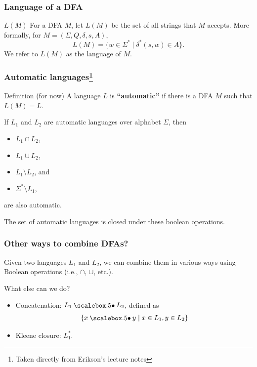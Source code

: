 \begin{frame}
  \frametitle{Language of a DFA}

  \begin{block}{$L(M)$}
    For a DFA $M$, let $L(M)$ be the set of all strings that $M$
    accepts.  More formally, for $M=(\Sigma,Q,\delta,s,A)$,
    \[
    L(M)=\{w\in\Sigma^* \;|\; \delta^*(s,w)\in A\}.
    \]
    We refer to $L(M)$ as the language of $M$.
  \end{block}
  
\end{frame}

\begin{frame}

  \frametitle{Automatic languages\footnote{Taken directly from Erikson's lecture notes}}

  \begin{block}{Definition (for now)}
    A language $L$ is {\color{red}\bf ``automatic''} if there is a DFA $M$
    such that $L(M)=L$.
  \end{block}

  \begin{lemma}
    If $L_1$ and $L_2$ are automatic languages over alphabet $\Sigma$,
    then
    \begin{itemize}
    \item $L_1\cap L_2$, 
    \item $L_1\cup L_2$, 
    \item $L_1\setminus L_2$, and 
    \item $\Sigma^* \setminus L_1$,
    \end{itemize}
    are also automatic.
  \end{lemma}

  The set of automatic languages is closed under these boolean
  operations.
  
\end{frame}

\begin{frame}
  \frametitle{Other ways to combine DFAs?}

  Given two languages $L_1$ and $L_2$, we can combine them in various
  ways using Boolean operations (i.e., $\cap$, $\cup$, etc.).

  What else can we do?

  \pause

  \begin{itemize}
  \item Concatenation: $L_1\sbullet L_2$, defined as \pause
    \[
    \{x\sbullet y \;|\; x\in L_1, y\in L_2 \}
    \]
    \pause
  \item Kleene closure: $L_1^*$.
  \end{itemize}
\end{frame}

